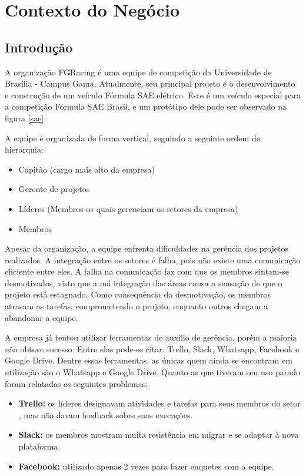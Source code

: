 
\chapter[Contexto do Negócio]{Contexto do Negócio}
\section{Introdução}
A organização FGRacing é uma equipe de competição da Universidade de Brasília -
Campus Gama. Atualmente, seu principal projeto é o desenvolvimento e construção
de um veículo Fórmula SAE elétrico. Este é um veículo especial para a competição
Fórmula SAE Brasil, e um protótipo dele pode ser observado na figura \ref{sae}.

A equipe é organizada de forma vertical, seguindo a seguinte ordem de hierarquia:

\begin{itemize}
  \item Capitão (cargo mais alto da empresa)
  \item Gerente de projetos
  \item Líderes (Membros os quais gerenciam os setores da empresa)
  \item Membros
\end{itemize}

Apesar da organização, a equipe enfrenta dificuldades na gerência dos projetos realizados. A integração entre os setores é falha,
 pois não existe uma comunicação eficiente entre eles. A falha na comunicação faz com que os membros sintam-se desmotivados,
  visto que a má integração das áreas causa a sensação de que o projeto está estagnado. Como consequência da desmotivação,
  os membros atrasam as tarefas, comprometendo o projeto, enquanto outros chegam a abandonar a equipe.

A empresa já tentou utilizar ferramentas de auxílio de gerência, porém a maioria não obteve sucesso. Entre elas pode-se
 citar: Trello, Slack, Whatsapp, Facebook e Google Drive. Dentre essas ferramentas, as únicas quem ainda se encontram
 em utilização são o Whatsapp e Google Drive. Quanto as que tiveram seu uso parado foram relatadas os seguintes problemas:

\begin{itemize}
  \item \textbf{Trello:} os líderes designavam atividades e tarefas para seus membros do setor , mas não davam feedback sobre suas execuções.
  \item \textbf{Slack:} os membros mostram muita resistência em migrar e se adaptar à nova plataforma.
  \item \textbf{Facebook:} utilizado apenas 2 vezes para fazer enquetes com a equipe.
\end{itemize}

